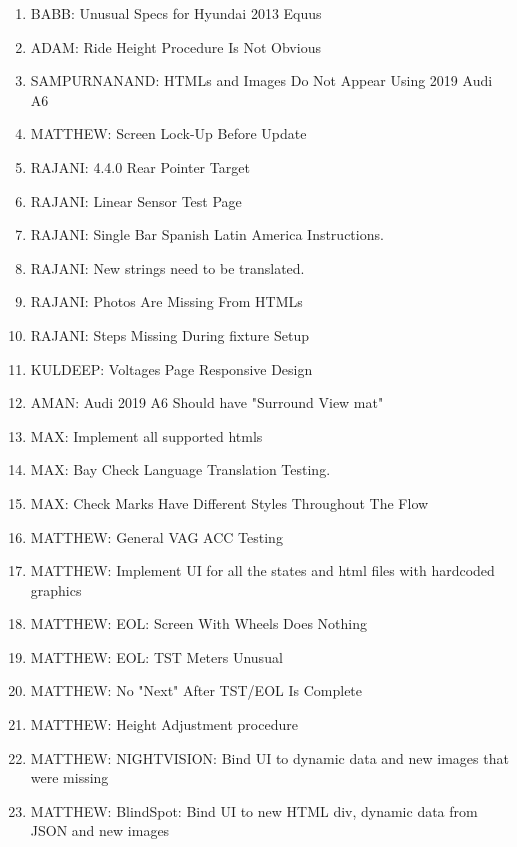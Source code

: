 \normalsize
\begin{enumerate}[leftmargin=!,labelindent=5pt,itemindent=-35pt]
\item {} BABB: Unusual Specs for Hyundai 2013 Equus
\item {} ADAM: Ride Height Procedure Is Not Obvious
\item {} SAMPURNANAND: HTMLs and Images Do Not Appear Using 2019 Audi A6
\item {} MATTHEW: Screen Lock-Up Before Update
\item {} RAJANI: 4.4.0 Rear Pointer Target
\item {} RAJANI: Linear Sensor Test Page
\item {} RAJANI: Single Bar Spanish Latin America Instructions.
\item {} RAJANI: New strings need to be translated.
\item {} RAJANI: Photos Are Missing From HTMLs
\item {} RAJANI: Steps Missing During fixture Setup
\item {} KULDEEP: Voltages Page Responsive Design
\item {} AMAN: Audi 2019 A6 Should have "Surround View mat"
\item {} MAX: Implement all supported htmls
\item {} MAX: Bay Check Language Translation Testing.
\item {} MAX: Check Marks Have Different Styles Throughout The Flow
\item {} MATTHEW: General VAG ACC Testing
\item {} MATTHEW: Implement UI for all the states and html files with hardcoded graphics
\item {} MATTHEW: EOL: Screen With Wheels Does Nothing
\item {} MATTHEW: EOL: TST Meters Unusual
\item {} MATTHEW: No "Next" After TST/EOL Is Complete
\item {} MATTHEW: Height Adjustment procedure
\item {} MATTHEW: NIGHTVISION: Bind UI to dynamic data and new images that were missing
\item {} MATTHEW: BlindSpot: Bind UI to new HTML div, dynamic data from JSON and new images

\end{enumerate}
